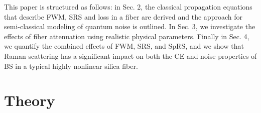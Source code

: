 \documentclass[10pt,letterpaper]{article}
\begin{document}
This paper is structured as follows: in Sec. 2, the classical propagation equations that describe FWM, SRS and loss in a fiber are derived and the approach for semi-classical modeling of quantum noise is outlined. In Sec. 3, we investigate the effects of fiber attenuation using realistic physical parameters. Finally in Sec. 4, we quantify the combined effects of FWM, SRS, and SpRS, and we show that Raman scattering has a significant impact on both the CE and noise properties of BS in a typical highly nonlinear silica fiber. 



%
%
%
%
\section{Theory}
\end{document}
